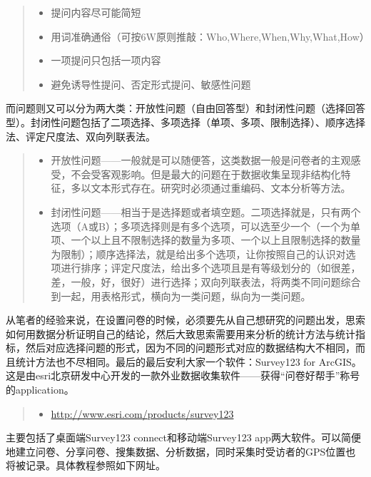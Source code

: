 \documentclass[]{ctexbook}
\providecommand{\tightlist}{%
  \setlength{\itemsep}{0pt}\setlength{\parskip}{0pt}}
\begin{document}
\begin{quote}
\begin{itemize}
\tightlist
\item
  提问内容尽可能简短
\item
  用词准确通俗（可按6W原则推敲：Who,Where,When,Why,What,How）
\item
  一项提问只包括一项内容
\item
  避免诱导性提问、否定形式提问、敏感性问题
\end{itemize}
\end{quote}

而问题则又可以分为两大类：开放性问题（自由回答型）和封闭性问题（选择回答型）。封闭性问题包括了二项选择、多项选择（单项、多项、限制选择）、顺序选择法、评定尺度法、双向列联表法。

\begin{quote}
\begin{itemize}
\tightlist
\item
  开放性问题------一般就是可以随便答，这类数据一般是问卷者的主观感受，不会受客观影响。但是最大的问题在于数据收集呈现非结构化特征，多以文本形式存在。研究时必须通过重编码、文本分析等方法。
\item
  封闭性问题------相当于是选择题或者填空题。二项选择就是，只有两个选项（A或B）；多项选择则是有多个选项，可以选至少一个（一个为单项、一个以上且不限制选择的数量为多项、一个以上且限制选择的数量为限制）；顺序选择法，就是给出多个选项，让你按照自己的认识对选项进行排序；评定尺度法，给出多个选项且是有等级划分的（如很差，差，一般，好，很好）进行选择；双向列联表法，将两类不同问题综合到一起，用表格形式，横向为一类问题，纵向为一类问题。
\end{itemize}
\end{quote}

从笔者的经验来说，在设置问卷的时候，必须要先从自己想研究的问题出发，思索如何用数据分析证明自己的结论，然后大致思索需要用来分析的统计方法与统计指标，然后对应选择问题的形式，因为不同的问题形式对应的数据结构大不相同，而且统计方法也不尽相同。最后的最后安利大家一个软件：Survey123 for ArcGIS。这是由esri北京研发中心开发的一款外业数据收集软件------获得``问卷好帮手''称号的application。

\begin{quote}
\begin{itemize}
\tightlist
\item
  \url{http://www.esri.com/products/survey123}
\end{itemize}
\end{quote}

主要包括了桌面端Survey123 connect和移动端Survey123 app两大软件。可以简便地建立问卷、分享问卷、搜集数据、分析数据，同时采集时受访者的GPS位置也将被记录。具体教程参照如下网址。
\end{document}
